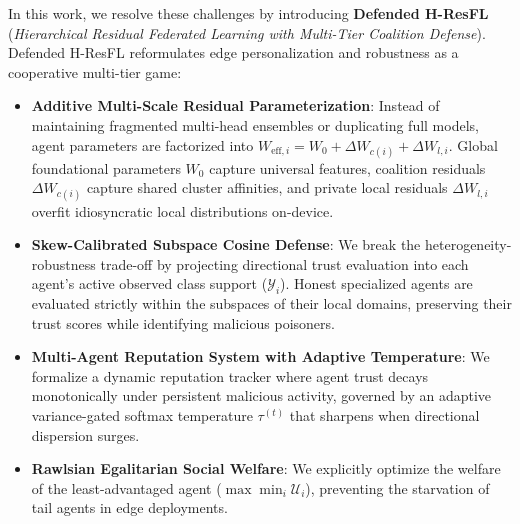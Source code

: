 \documentclass[sigconf]{acmart}
\begin{document}
In this work, we resolve these challenges by introducing \textbf{Defended H-ResFL} (\textit{Hierarchical Residual Federated Learning with Multi-Tier Coalition Defense}). Defended H-ResFL reformulates edge personalization and robustness as a cooperative multi-tier game:
\begin{itemize}
    \item \textbf{Additive Multi-Scale Residual Parameterization}: Instead of maintaining fragmented multi-head ensembles or duplicating full models, agent parameters are factorized into $W_{\text{eff}, i} = W_0 + \Delta W_{c(i)} + \Delta W_{l, i}$. Global foundational parameters $W_0$ capture universal features, coalition residuals $\Delta W_{c(i)}$ capture shared cluster affinities, and private local residuals $\Delta W_{l, i}$ overfit idiosyncratic local distributions on-device.
    \item \textbf{Skew-Calibrated Subspace Cosine Defense}: We break the heterogeneity-robustness trade-off by projecting directional trust evaluation into each agent's active observed class support ($\mathcal{Y}_i$). Honest specialized agents are evaluated strictly within the subspaces of their local domains, preserving their trust scores while identifying malicious poisoners.
    \item \textbf{Multi-Agent Reputation System with Adaptive Temperature}: We formalize a dynamic reputation tracker where agent trust decays monotonically under persistent malicious activity, governed by an adaptive variance-gated softmax temperature $\tau^{(t)}$ that sharpens when directional dispersion surges.
    \item \textbf{Rawlsian Egalitarian Social Welfare}: We explicitly optimize the welfare of the least-advantaged agent ($\max \min_i \mathcal{U}_i$), preventing the starvation of tail agents in edge deployments.
\end{itemize}
\end{document}
